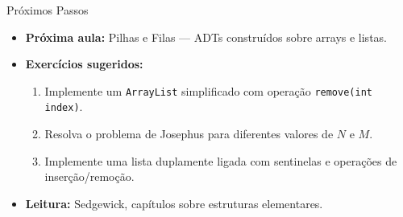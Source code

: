 \documentclass[aspectratio=169]{beamer}
\begin{document}
\begin{frame}{Próximos Passos}
    \begin{itemize}
        \item \textbf{Próxima aula:} Pilhas e Filas --- ADTs construídos sobre arrays e listas.
        \item \textbf{Exercícios sugeridos:}
            \begin{enumerate}
                \item Implemente um \texttt{ArrayList} simplificado com operação \texttt{remove(int index)}.
                \item Resolva o problema de Josephus para diferentes valores de $N$ e $M$.
                \item Implemente uma lista duplamente ligada com sentinelas e operações de inserção/remoção.
            \end{enumerate}
        \item \textbf{Leitura:} Sedgewick, capítulos sobre estruturas elementares.
    \end{itemize}
\end{frame}
\end{document}

